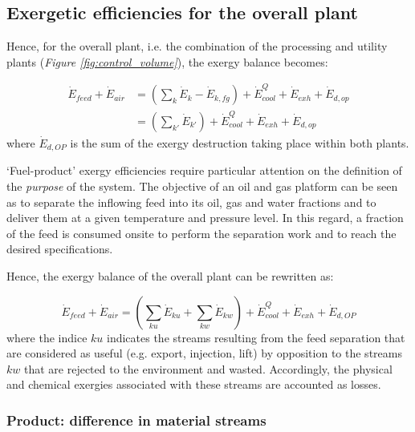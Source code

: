 	
\subsection{Exergetic efficiencies for the overall plant}
\label{section:eff_overall}

Hence, for the overall plant, i.e. the combination of the processing and utility plants (\emph{Figure \ref{fig:control_volume}}), the exergy balance becomes:

\begin{align}
	\dot{E}_{feed}+\dot{E}_{air}&=\left(\sum_k\dot{E}_k-\dot{E}_{k,fg}\right)+\dot{E}^{Q}_{cool}+\dot{E}_{exh}+\dot{E}_{d,op} \nonumber\\
											&=\left(\sum_{k'}\dot{E}_{k'}\right)+\dot{E}^{Q}_{cool}+\dot{E}_{exh}+\dot{E}_{d,op}
\end{align}
where $\dot{E}_{d,OP}$ is the sum of the exergy destruction taking place within both plants. 



`Fuel-product' exergy efficiencies require particular attention on the definition of the \emph{purpose} of the system. The objective of an oil and gas platform can be seen as to separate the inflowing feed into its oil, gas and water fractions and to deliver them at a given temperature and pressure level. In this regard, a fraction of the feed is consumed onsite to perform the separation work and to reach the desired specifications. 



Hence, the exergy balance of the overall plant can be rewritten as:

\begin{equation}
	\dot{E}_{feed}+\dot{E}_{air}=\left(\sum_{ku}\dot{E}_{ku}+\sum_{kw}\dot{E}_{kw}\right)+\dot{E}^{Q}_{cool}+\dot{E}_{exh}+\dot{E}_{d,OP}
\end{equation}
where the indice $ku$ indicates the streams resulting from the feed separation that are considered as useful (e.g. export, injection, lift) by opposition to the streams $kw$ that are rejected to the environment and wasted. Accordingly, the physical and chemical exergies associated with these streams are accounted as losses.
	
\subsubsection{Product: difference in material streams}
	
